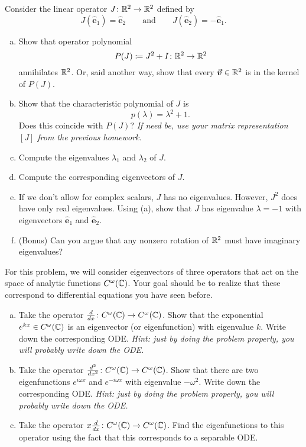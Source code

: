 \documentclass[12pt]{article} %
\newcommand{\ehat}{\boldsymbol{\hat{e}}}
\begin{document}
\begin{problem}
Consider the linear operator $J\colon \mathbb{R}^2 \to \mathbb{R}^2$ defined by
\[
J(\ehat_1) = \ehat_2 \qquad \textrm{and} \qquad J(\ehat_2) = -\ehat_1.
\]
\begin{enumerate}[(a)]
    \item Show that operator polynomial
    \[
    P(J) \coloneqq J^2 + I \colon \mathbb{R}^2 \to \mathbb{R}^2
    \]
    annihilates $\mathbb{R}^2$. Or, said another way, show that every $\boldsymbol{\vec{v}} \in \mathbb{R}^2$ is in the kernel of $P(J)$.
    \item Show that the characteristic polynomial of $J$ is
    \[
    p(\lambda) = \lambda^2 + 1.
    \]
    Does this coincide with $P(J)$? \emph{If need be, use your matrix representation $[J]$ from the previous homework.}
    \item Compute the eigenvalues $\lambda_1$ and $\lambda_2$ of $J$.
    \item Compute the corresponding eigenvectors of $J$.
    \item If we don't allow for complex scalars, $J$ has no eigenvalues. However, $J^2$ does have only real eigenvalues. Using (a), show that $J$ has eigenvalue $\lambda=-1$ with eigenvectors $\ehat_1$ and $\ehat_2$.
    \item (Bonus) Can you argue that any nonzero rotation of $\mathbb{R}^2$ must have imaginary eigenvalues?
\end{enumerate}
\end{problem}

\begin{problem} For this problem, we will consider eigenvectors of three operators that act on the space of analytic functions $C^\omega(\mathbb{C})$. Your goal should be to realize that these correspond to differential equations you have seen before.
\begin{enumerate}[(a)]
    \item Take the operator $\frac{d}{dx}\colon C^\omega(\mathbb{C})\to C^\omega(\mathbb{C})$. Show that the exponential $e^{kx}\in C^\omega(\mathbb{C})$ is an eigenvector (or eigenfunction) with eigenvalue $k$. Write down the corresponding ODE. \emph{Hint: just by doing the problem properly, you will probably write down the ODE.}
    \item Take the operator $\frac{d^2}{dx^2}\colon C^\omega(\mathbb{C})\to C^\omega(\mathbb{C})$. Show that there are two eigenfunctions $e^{i\omega x}$ and $e^{-i\omega x}$ with eigenvalue $-\omega^2$. Write down the corresponding ODE. \emph{Hint: just by doing the problem properly, you will probably write down the ODE.}
    \item Take the operator $x\frac{d}{dx} \colon C^\omega(\mathbb{C}) \to C^\omega(\mathbb{C})$. Find the eigenfunctions to this operator using the fact that this corresponds to a separable ODE.
\end{enumerate}
\end{problem}
\end{document}
